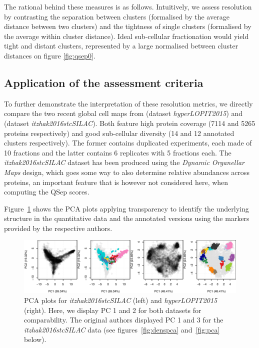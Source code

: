 \documentclass[12pt]{article}\usepackage[]{graphicx}\usepackage[]{color}
\makeatletter
\def\maxwidth{ %
  \ifdim\Gin@nat@width>\linewidth
    \linewidth
  \else
    \Gin@nat@width
  \fi
}
\newenvironment{knitrout}{}{} %
\makeatother
\begin{document}
The rational behind these measures is as follows. Intuitively, we
assess resolution by contrasting the separation between clusters
(formalised by the average distance between two clusters) and the
tightness of single clusters (formalised by the average within cluster
distance). Ideal sub-cellular fractionation would yield tight and
distant clusters, represented by a large normalised between cluster
distances on figure \ref{fig:qsep0}.

\clearpage

\subsection{Application of the assessment criteria}\label{sec:applic}



To further demonstrate the interpretation of these resolution metrics,
we directly compare the two recent global cell maps from
\cite{Christoforou:2016} (dataset \textit{hyperLOPIT2015}) and
\cite{Itzhak:2016} (dataset \textit{itzhak2016stcSILAC}). Both feature
high protein coverage (7114 and 5265 proteins
respectively) and good sub-cellular diversity (14 and
12 annotated clusters respectively). The former contains
duplicated experiments, each made of 10 fractions and the latter
contains 6 replicates with 5 fractions each. The
\textit{itzhak2016stcSILAC} dataset has been produced using the
\textit{Dynamic Organellar Maps} design, which goes some way to also
determine relative abundances across proteins, an important feature
that is however not considered here, when computing the QSep scores.

Figure~\ref{fig:pcacmp} shows the PCA plots applying transparency to
identify the underlying structure in the quantitative data and the
annotated versions using the markers provided by the respective
authors.

\begin{figure}[!h]
  \centering
\begin{knitrout}
\color{fgcolor}
\includegraphics[width=\maxwidth]{figure/pcacmp-1} 

\end{knitrout}
\caption{PCA plots for \textit{itzhak2016stcSILAC} (left) and
  \textit{hyperLOPIT2015} (right). Here, we display PC 1 and 2 for
  both datasets for comparability. The original authors displayed PC 1
  and 3 for the \textit{itzhak2016stcSILAC} data (see
  figures~\ref{fig:denspca} and~\ref{fig:pca} below).}
  \label{fig:pcacmp}
\end{figure}
\end{document}
